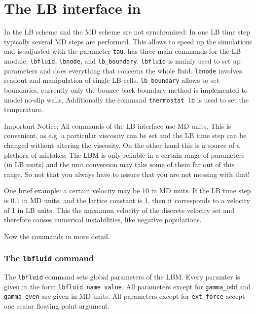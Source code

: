 

\chapter{The LB interface in \ES{}}
In \ES{} the LB scheme and the MD scheme are not synchronized: In one
LB time step typically several MD steps are performed. This allows to speed
up the simulations and is adjusted with the parameter \lstinline|tau|.
\ES{} has three main commands for the LB module: 
 \lstinline|lbfluid|,  \lstinline|lbnode|, and  \lstinline|lb_boundary|.
 \lstinline|lbfluid| is mainly used to set up parameters and does everything that
concerns the whole fluid.  \lstinline|lbnode| involves readout and manipulation of
single LB cells.  \lstinline|lb_boundary| allows to set boundaries, currently only
the bounce back boundary method is implemented to model
no-slip walls. Additionally the command  \lstinline|thermostat lb| is used to set
the temperature. 

Important Notice: All commands of the LB interface use
MD units. This is convenient, as e.g. a particular 
viscosity can be set and the LB time step can be changed without
altering the viscosity. On the other hand this is a source
of a plethora of mistakes: The LBM is only reliable in a certain 
range of parameters (in LB units) and the unit conversion
may take some of them far out of this range. So not that you always
have to assure that you are not messing with that!

One brief example: a certain velocity may be 10 in MD units.
If the LB time step is 0.1 in MD units, and the lattice constant
is 1, then it corresponds to a velocity of 1 in LB units. 
This the maximum velocity of the discrete velocity set and therefore
causes numerical instabilities, like negative populations.

Now the commands in more detail.

\subsection*{The \lstinline|lbfluid| command}
The \lstinline{lbfluid} command sets global parameters of the LBM. Every
paramter is given in the form \lstinline|lbfluid name value|. 
All parameters except for \lstinline|gamma_odd| and  \lstinline|gamma_even|
are given in MD units. All parameters except for \lstinline|ext_force| accept
one scalar floating point argument. \\

